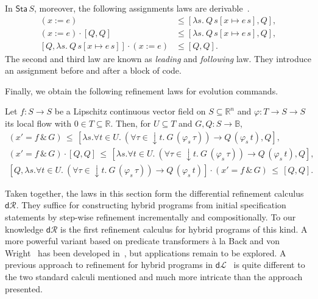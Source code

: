 \documentclass[envcountsame,envcountsect]{llncs}
\newcommand{\dL}{\mathsf{d}\mathcal{L}}
\newcommand{\dR}{\mathsf{d}\mathcal{R}}
\newcommand{\flow}{\varphi}
\newcommand{\reals}{\mathbb{R}}
\newcommand{\bools}{\mathbb{B}}
\newcommand{\sta}{\mathsf{Sta}}
\begin{document}
In $\sta\, S$, moreover, the following assignments laws are
derivable~\cite{ArmstrongGS16}.
\begin{align}
 (x := e)  &\le  \left[\lambda s.\ Q\, s[x\mapsto e\, s],Q\right],\label{eq:r-assgn}\tag{r-assgn}\\
(x:= e) \cdot \left[Q,Q\right] &\le [\lambda s.\ Q\, s[x\mapsto e\, s],Q],\label{eq:r-assgn}\tag{r-assgnl}\\
\left[Q,\lambda s.\ Q\, s[x\mapsto e\, s]\right]\cdot (x:=e) &\le [Q,Q]. \label{eq:r-assgn}\tag{r-assgnf}
\end{align}
The second and third law are known as \emph{leading} and \emph{following}
law. They introduce an assignment before and after a block of code. 

Finally, we obtain the following refinement laws for evolution
commands.
\begin{lemma}\label{P:r-evl-lemma}
  Let $f:S\to S$ be a Lipschitz continuous vector field on
  $S\subseteq \reals^n$ and $\flow:T\to S\to S$ its local flow with
  $0\in T\subseteq \reals$. Then, for $U\subseteq T$ and
  $G,Q:S\to\bools$,
\begin{gather*}
(x' = f\, \&\, G)\, \le\, [\lambda s.\forall t\in U.\ (\forall
\tau\in {\downarrow}t.\ G\, (\flow_s\, \tau))\to Q\, (\flow_s\, t),Q],\label{eq:r-evl}\tag{r-evl}\\
(x' = f\, \&\, G) \cdot \left[Q,Q\right]\, \le\, [\lambda s. \forall t\in U.\ (\forall
\tau\in {\downarrow}t.\ G\, (\flow_s\, \tau))\to Q\, (\flow_s\, t),Q],\label{eq:r-evll}\tag{r-evll}\\
\left[Q,\lambda s. \forall t\in U.\ (\forall
\tau\in {\downarrow}t.\ G\, (\flow_s\, \tau))\to Q\, (\flow_s\,
t)\right]\cdot (x' = f\, \&\, G) \, \le \, [Q,Q].\label{eq:r-evlr}\tag{r-evlr}
\end{gather*}
\end{lemma}

Taken together, the laws in this section form the differential
refinement calculus $\dR$.  They suffice for constructing hybrid
programs from initial specification statements by step-wise refinement
incrementally and compositionally. To our knowledge $\dR$ is the first
refinement calculus for hybrid programs of this kind.  A more powerful
variant based on predicate transformers \`a la Back and von
Wright~\cite{BackW98} has been developed in~\cite{MuniveS19}, but
applications remain to be explored.  A previous approach to refinement
for hybrid programs in $\dL$~\cite{LoosP16} is quite different to the
two standard calculi mentioned and much more intricate than the
approach presented.
\end{document}
